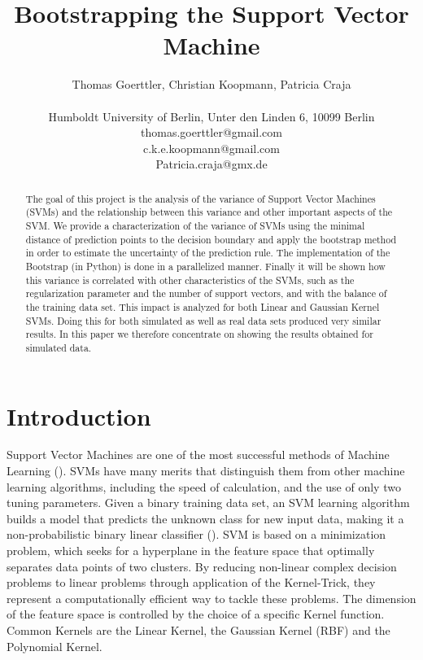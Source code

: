 \documentclass[a4paper]{article}
\title{Bootstrapping the Support Vector Machine}
\author{Thomas Goerttler, Christian Koopmann, Patricia Craja \\
\mbox{}\\
Humboldt University of Berlin, Unter den Linden 6, 10099 Berlin \\
thomas.goerttler@gmail.com\\
c.k.e.koopmann@gmail.com\\
Patricia.craja@gmx.de\\
}
\begin{document}
\maketitle


\begin{abstract}
The goal of this project is the analysis of the variance of Support Vector Machines (SVMs) and the relationship between this variance and other important aspects of the SVM. We provide a characterization of the variance of SVMs using the minimal distance of prediction points to the decision boundary and apply the bootstrap method in order to estimate the uncertainty of the prediction rule. The implementation of the Bootstrap (in Python) is done in a parallelized manner. Finally it will be shown how this variance is correlated with other characteristics of the SVMs, such as the regularization parameter and the number of support vectors, and with the balance of the training data set. This impact is analyzed for both Linear and Gaussian Kernel SVMs. Doing this for both simulated  as well as real data sets produced very similar results. In this paper we therefore concentrate on showing the results obtained for simulated data. 
  
\end{abstract}

\section{Introduction}

Support Vector Machines are one of the most successful methods of Machine Learning (\cite{steinwart_support_2008}). SVMs have many merits that distinguish them from other machine learning algorithms, including the speed of calculation, and the use of only two tuning parameters. Given a binary training data set, an SVM learning algorithm builds a model that predicts the unknown class for new input data, making it a non-probabilistic binary linear classifier (\cite{cristianini_introduction_2000}). SVM is based on a minimization problem, which seeks for a hyperplane in the feature space that optimally separates data points of two clusters.  By reducing non-linear complex decision problems to linear problems through application of the Kernel-Trick, they represent a computationally efficient way to tackle these problems. The dimension of the feature space is controlled by the choice of a specific Kernel function. Common Kernels are the Linear Kernel, the Gaussian Kernel (RBF) and the Polynomial Kernel.
\end{document}
